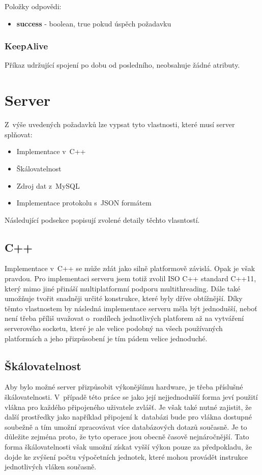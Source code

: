 \documentclass[thesis=B,czech]{FITthesis}[2013/10/20]
\begin{document}
Položky odpovědi:
\begin{itemize}
  \item \textbf{success} - boolean, true pokud úspěch požadavku
\end{itemize}

\subsubsection{KeepAlive}
Příkaz udržující spojení po dobu od posledního, neobsahuje žádné atributy.

\section{Server}

Z~výše uvedených požadavků lze vypsat tyto vlastnosti, které musí server splňovat:

\begin{itemize}
  \item{Implementace v~C++}
  \item{Škálovatelnost}
  \item{Zdroj dat z~MySQL}
  \item{Implementace protokolu s~JSON formátem}
\end{itemize}

Následující podsekce popisují zvolené detaily těchto vlasntostí.

\subsection{C++}

Implementace v~C++ se může zdát jako silně platformově závislá. Opak je však pravdou. Pro implementaci serveru jsem totiž zvolil ISO C++ standard C++11, který mimo jiné přináší multiplatformní podporu multithreading. Dále také umožňuje tvořit snadněji určité konstrukce, které byly dříve obtížnější. Díky těmto vlastnostem by následná implementace serveru měla být jednodušší, neboť není třeba příliš uvažovat o~rozdílech jednotlivých platforem až na vytváření serverového socketu, které je ale velice podobný na všech používaných platformách a jeho přizpůsobení je tím pádem velice jednoduché.

\subsection{Škálovatelnost}

Aby bylo možné server přizpůsobit výkonějšímu hardware, je třeba příslušné škálovatelnosti. V~případě této práce se jako její nejjednodušší forma jeví použití vlákna pro každého připojeného uživatele zvlášť. Je však také nutné zajistit, že další prostředky jako například připojení k~databázi bude pro vlákna dostupné soubežně a tím umožní zpracovávat více databázových dotazů současně. Je to důležite zejména proto, že tyto operace jsou obecně časově nejnáročnější. Tato forma škálovatelnosti však umožní získat vyšší výkon pouze za předpokladu, že dojde ke zvýšení počtu výpočetních jednotek, které mohou provádět instrukce jednotlivých vláken současně.
\end{document}
